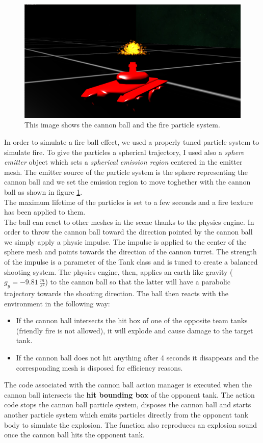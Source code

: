 \documentclass[14pt]{article}
\begin{document}
\begin{figure}[H]
\includegraphics[width=12cm]{images/cannonBall2.png}
\caption{This image shows the cannon ball and the fire particle system.}
\label{img:cannon}
\end{figure}




In order to simulate a fire ball effect, we used a properly tuned particle system to simulate fire. To give the particles a spherical trajectory, I used also a \textit{sphere emitter} object which sets a \textit{spherical emission region} centered in the emitter mesh. The emitter source of the particle system is the sphere representing the cannon ball and we set the emission region to move toghether with the cannon ball as shown in figure \ref{img:cannon}.\\
The maximum lifetime of the particles is set to a few seconds and a fire texture has been applied to them.\\
The ball can react to other meshes in the scene thanks to the physics engine. In order to throw the cannon ball toward the direction pointed by the cannon ball we simply apply a physic impulse. The impulse is applied to the center of the sphere mesh and points towards the direction of the cannon turret. The strength of the impulse is a parameter of the Tank class and is tuned to create a balanced shooting system. The physics engine, then, applies an earth like gravity  (\(g_{y} = -9.81 \ \frac{m}{s^{2}}\)) to the cannon ball so that the latter will have a parabolic trajectory towards the shooting direction. The ball then reacts with the environment in the following way:
\begin{itemize}
\item  If the cannon ball intersects the hit box of one of the opposite team tanks (friendly fire is not allowed), it will explode and cause damage to the target tank. 
\item If the cannon ball does not hit anything after 4 seconds it disappears and the corresponding mesh is disposed for efficiency reasons.
\end{itemize}
The code associated with the cannon ball action manager is executed when the cannon ball intersects the \textbf{hit bounding box} of the opponent tank. The action code stops the cannon ball particle system, disposes the cannon ball and starts another particle system which emits particles directly from the opponent tank body to simulate the explosion. The function also reproduces an explosion sound once the cannon ball hits the opponent tank.
\end{document}
